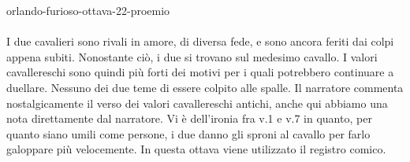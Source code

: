 \documentclass[preview]{standalone}
\begin{document}
\begin{snippet}{orlando-furioso-ottava-22-proemio}
    \\\\
    I due cavalieri sono rivali in amore, di diversa fede, e sono ancora
    feriti dai colpi appena subiti. Nonostante ciò, i due si trovano sul medesimo cavallo.
    I valori cavallereschi sono quindi più forti dei motivi per i quali
    potrebbero continuare a duellare. Nessuno dei due teme di essere colpito alle spalle.
    Il narratore commenta nostalgicamente il verso dei valori cavallereschi antichi,
    anche qui abbiamo una nota direttamente dal narratore.
    Vi è dell'ironia fra v.1 e v.7 in quanto, per quanto siano umili come persone, i due
    danno gli sproni al cavallo per farlo galoppare più velocemente.
    In questa ottava viene utilizzato il registro comico.
\end{snippet}
\end{document}
